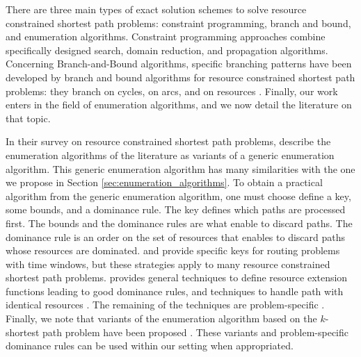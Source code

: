 \documentclass[11pt]{amsart}
\theoremstyle{plain}
\theoremstyle{remark}
\begin{document}
There are three main types of exact solution schemes to solve resource constrained shortest path problems: constraint programming, branch and bound, and enumeration algorithms. Constraint programming approaches \cite{rousseau2004solving,fahle2002constraint,gualandi2009constraint,de2001combining,junker1999framework} combine specifically designed search, domain reduction, and propagation algorithms. Concerning Branch-and-Bound algorithms, specific branching patterns have been developed by branch and bound algorithms for resource constrained shortest path problems: they branch on cycles, on arcs, and on resources \cite{irnich2008resource,righini2009decremental,beasley1989algorithm,borndorfer2001scheduling}. Finally, our work enters in the field of enumeration algorithms, and we now detail the literature on that topic.

In their survey on resource constrained shortest path problems, \citet{irnich2005shortest} describe the enumeration algorithms of the literature as variants of a generic enumeration algorithm. This generic enumeration algorithm has many similarities with the one we propose in Section \ref{sec:enumeration_algorithms}. To obtain a practical algorithm from the generic enumeration algorithm, one must choose define a key, some bounds, and a dominance rule. The key defines which paths are processed first. The bounds and the dominance rules are what enable to discard paths. The dominance rule is an order on the set of resources that enables to discard paths whose resources are dominated. \citet{desrochers1988generalized} and \cite{powell1998generalized} provide specific keys for routing problems with time windows, but these strategies apply to many resource constrained shortest path problems. \citet{irnich2008resource} provides general techniques to define resource extension functions leading to good dominance rules, and techniques to handle path with identical resources \citep{irnich2006shortest}. The remaining of the techniques are problem-specific \cite{beasley1989algorithm,feillet2004exact,kohl19992,larsen1999parallelization,irnich2006shortest,ioachim1998dynamic}. Finally, we note that variants of the enumeration algorithm based on the $k$-shortest path problem \citep{eppstein1998finding} have been proposed \cite{handler1980dual,beasley1989algorithm,santos2007improved}. These variants and problem-specific dominance rules can be used within our setting when appropriated.
\end{document}

